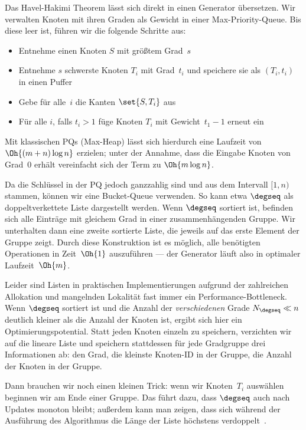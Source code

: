Das Havel-Hakimi Theorem lässt sich direkt in einen Generator übersetzen.
Wir verwalten Knoten mit ihren Graden als Gewicht in einer Max-Priority-Queue.
Bis diese leer ist, führen wir die folgende Schritte aus:
\begin{itemize}
    \item Entnehme einen Knoten $S$ mit größtem Grad~$s$
    \item Entnehme $s$ schwerste Knoten $T_i$ mit Grad~$t_i$ und speichere sie als $(T_i, t_i)$ in einen Puffer
    \item Gebe für alle~$i$ die Kanten $\set{S, T_i}$ aus
    \item Für alle $i$, falls $t_i > 1$ füge Knoten $T_i$ mit Gewicht~$t_1 - 1$ erneut ein
\end{itemize}

Mit klassischen PQs (\zB Max-Heap) lässt sich hierdurch eine Laufzeit von $\Oh{(m + n) \log n}$ erzielen;
unter der Annahme, dass die Eingabe Knoten von Grad~0 erhält vereinfacht sich der Term zu $\Oh{m \log n}$.

Da die Schlüssel in der PQ jedoch ganzzahlig sind und aus dem Intervall $[1, n)$ stammen, können wir eine Bucket-Queue verwenden.
So kann etwa $\degseq$ als doppeltverkettete Liste dargestellt werden.
Wenn $\degseq$ sortiert ist, befinden sich alle Einträge mit gleichem Grad in einer zusammenhängenden Gruppe.
Wir unterhalten dann eine zweite sortierte Liste, die jeweils auf das erste Element der Gruppe zeigt.
Durch diese Konstruktion ist es möglich, alle benötigten Operationen in Zeit~$\Oh{1}$ auszuführen --- der Generator läuft also in optimaler Laufzeit~$\Oh{m}$.

Leider sind Listen in praktischen Implementierungen aufgrund der zahlreichen Allokation und mangelnden Lokalität fast immer ein Performance-Bottleneck.
Wenn $\degseq$ sortiert ist und die Anzahl der \emph{verschiedenen} Grade $N_\degseq \ll n$ deutlich kleiner als die Anzahl der Knoten ist, ergibt sich hier ein Optimierungspotential.
Statt jeden Knoten einzeln zu speichern, verzichten wir auf die  lineare Liste und speichern stattdessen für jede Gradgruppe drei Informationen ab:
den Grad, die kleinste Knoten-ID in der Gruppe, die Anzahl der Knoten in der Gruppe.

Dann brauchen wir noch einen kleinen Trick: wenn wir Knoten~$T_i$ auswählen beginnen wir am Ende einer Gruppe.
Das führt dazu, dass $\degseq$ auch nach Updates monoton bleibt; außerdem kann man zeigen, dass sich während der Ausführung des Algorithmus die Länge der Liste höchstens verdoppelt~\cite{DBLP:journals/jea/HamannMPTW18}.

